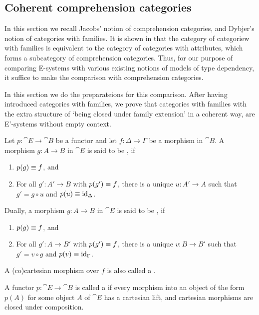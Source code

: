 \subsection{Coherent comprehension categories}
In this section we recall Jacobs' notion of comprehension categories, and 
Dybjer's notion of categories with families. It is shown in 
\cite{Hofmann_syntax_semantics} that the category of categoriew with families
is equivalent to the category of categories with attributes, which forms a
subcategory of comprehension categories. Thus, for our purpose of comparing
E-systems with various existing notions of models of type dependency, it suffice
to make the comparison with comprehension categories.

In this section we do the preparateions for this comparison. After having
introduced categories with families, we prove that categories with families
with the extra structure of `being closed under family extension' in a coherent
way, are E'-systems without empty context. 

\begin{defn}
Let $p:\cat{E}\to\cat{B}$ be a functor and let $f:\Delta\to \Gamma$ be a morphism in $\cat{B}$.
A morphism $g:A\to B$ in $\cat{E}$ is said to be , if
\begin{enumerate}
\item $p(g)\equiv f$, and 
\item For all $g':A'\to B$ with $p(g')\equiv f$, there is a unique $u:A'\to A$
such that $g'=g\circ u$ and $p(u)\equiv{\mathrm{id}_{\Delta}}$. 
\end{enumerate}
Dually, a morphism $g:A\to B$ in $\cat{E}$ is said to be , if
\begin{enumerate}
\item $p(g)\equiv f$, and
\item For all $g':A\to B'$ with $p(g')\equiv f$, there is a unique $v:B\to B'$
such that $g'=v\circ g$ and $p(v)\equiv{\mathrm{id}_{\Gamma}}$. 
\end{enumerate}
A (co)cartesian morphism over $f$ is also called a .
\end{defn}

\begin{defn}
A functor $p:\cat{E}\to\cat{B}$ is called a  if
every morphism into an object of the form $p(A)$ for some object $A$ of $\cat{E}$ 
has a cartesian lift, and cartesian morphisms are closed under composition.
\end{defn}

